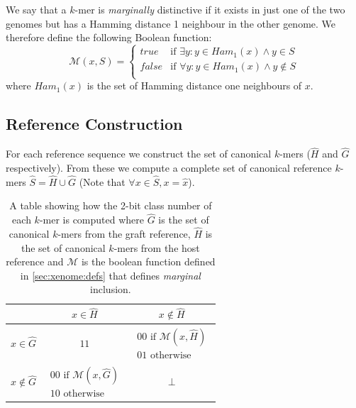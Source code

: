 \documentclass[twocolumn]{article}
\begin{document}
We say that a $k$-mer is \textit{marginally} distinctive if it exists in just one of the two genomes
but has a Hamming distance 1 neighbour in the other genome. We therefore define
the following Boolean function:
$$
\mathcal{M}(x, S) =
\left\{
    \begin{array}{ll}
        \mathit{true} & \mbox{if } \exists y : y \in \textit{Ham}_1(x)
                      \wedge y \in S    \\
        \mathit{false} & \mbox{if } \forall y : y \in \textit{Ham}_1(x)
                      \wedge y \notin S  \\
    \end{array}
\right.
$$
where $\textit{Ham}_1(x)$ is the set of Hamming distance one neighbours
of $x$.

\subsection{Reference Construction}

For each reference sequence we construct the set of
canonical $k$-mers ($\hat{H}$ and $\hat{G}$ respectively).  From these
we compute a complete set of canonical reference $k$-mers
$\hat{S} = \hat{H} \cup \hat{G}$
(Note that $\forall x \in \hat{S}, x = \hat{x}$).

\begin{table}
\label{tbl:class}
\begin{center}
\begin{tabular}{l|c|c}
                & $x \in \hat{H}$ & $x \notin \hat{H}$  \\
\hline
$x \in \hat{G}$   & $11$      & $\begin{array}{l} 00 \mbox{ if } \mathcal{M}(x, \hat{H}) \\
                                                                  01 \mbox{ otherwise} \end{array}$              \\
\hline
$x \notin \hat{G}$& $\begin{array}{l} 00 \mbox{ if } \mathcal{M}(x, \hat{G}) \\
                                                  10 \mbox{ otherwise} \end{array}$ & $\bot$       \\
\end{tabular}
\end{center}
\caption{A table showing how the 2-bit class number of each $k$-mer is computed where $\hat{G}$ is the set of canonical
$k$-mers from the graft reference, $\hat{H}$ is the set of canonical $k$-mers from the host reference and $\mathcal{M}$
is the boolean function defined in \ref{sec:xenome:defs} that defines \textit{marginal} inclusion.}
\end{table}
\end{document}
